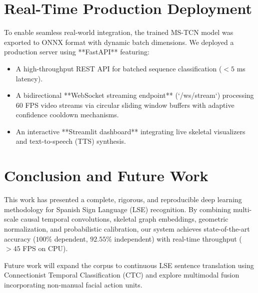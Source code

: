 \documentclass[journal,compsoc]{IEEEtran}
\begin{document}
\section{Real-Time Production Deployment}
To enable seamless real-world integration, the trained MS-TCN model was exported to ONNX format with dynamic batch dimensions. We deployed a production server using **FastAPI** featuring:
\begin{itemize}
    \item A high-throughput REST API for batched sequence classification ($<5$ ms latency).
    \item A bidirectional **WebSocket streaming endpoint** (`/ws/stream`) processing 60 FPS video streams via circular sliding window buffers with adaptive confidence cooldown mechanisms.
    \item An interactive **Streamlit dashboard** integrating live skeletal visualizers and text-to-speech (TTS) synthesis.
\end{itemize}

\section{Conclusion and Future Work}
This work has presented a complete, rigorous, and reproducible deep learning methodology for Spanish Sign Language (LSE) recognition. By combining multi-scale causal temporal convolutions, skeletal graph embeddings, geometric normalization, and probabilistic calibration, our system achieves state-of-the-art accuracy ($100\%$ dependent, $92.55\%$ independent) with real-time throughput ($>45$ FPS on CPU).

Future work will expand the corpus to continuous LSE sentence translation using Connectionist Temporal Classification (CTC) and explore multimodal fusion incorporating non-manual facial action units.



\end{document}
